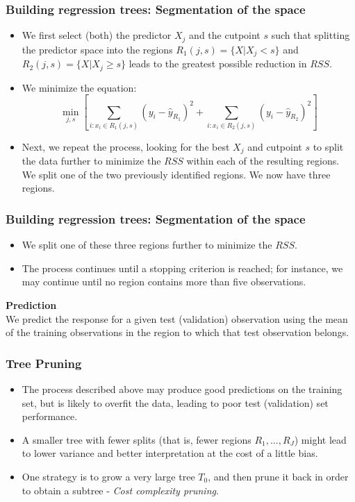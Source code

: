 \documentclass{beamer}
\begin{document}
\begin{frame}\frametitle{Building regression trees: Segmentation of the space}
\begin{itemize}
\item We first select (both) the predictor $X_j$ and the cutpoint $s$ such
that splitting the predictor space into the regions
$R_1(j,s)=\{X|X_j<s\}$ and $R_2(j,s)=\{X|X_j\geq s\}$ leads to the greatest possible
reduction in $RSS$.
\item We minimize the equation:
$$\min_{j,s}\left[\sum_{i: x_i\in R_1(j,s)}\left(y_i-\hat{y}_{R_1}\right)^2+\sum_{i: x_i\in R_2(j,s)}\left(y_i-\hat{y}_{R_2}\right)^2\right]$$
\item Next, we repeat the process, looking for the best $X_j$ and cutpoint $s$ to split the data further to
minimize the $RSS$ within each of the resulting regions. We split one of the two previously identified regions. We now have three regions.
\end{itemize}
\end{frame}

\begin{frame}\frametitle{Building regression trees: Segmentation of the space}

\begin{itemize}
\item We split one of these three regions further to minimize the $RSS$.
\vspace*{0.2cm}
\item The process continues until a
stopping criterion is reached; for instance, we may continue
until no region contains more than five observations.
\vspace*{0.2cm}
\end{itemize}
\textbf{Prediction}\\
We predict the response for a given test (validation) observation using
the mean of the training observations in the region to
which that test observation belongs.
\end{frame}

\begin{frame}\frametitle{Tree Pruning}

\begin{itemize}
\item The process described above may produce good predictions on the training
set, but is likely to overfit the data, leading to poor test (validation) set performance.
\vspace*{0.2cm}
\item A smaller tree with fewer splits (that is, fewer regions
$R_1,...,R_J$) might lead to lower variance and better
interpretation at the cost of a little bias.
\vspace*{0.2cm}
\item One strategy is to grow a very large tree $T_0$, and then
prune it back in order to obtain a subtree - \textit{Cost complexity pruning}.
\end{itemize}
\end{frame}
\end{document}
